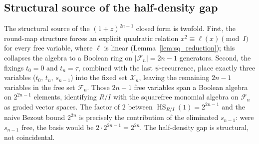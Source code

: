 \documentclass[11pt,a4paper]{article}
\theoremstyle{definition}
\begin{document}
\subsection*{Structural source of the half-density gap}\label{app:dreg:remarks}

The structural source of the $(1 + z)^{2n - 1}$ closed form is
twofold. First, the round-map structure forces an explicit quadratic
relation $x^2 \equiv \ell(x) \pmod I$ for every free variable, where
$\ell$ is linear (Lemma~\ref{lem:sq_reduction}); this collapses the
algebra to a Boolean ring on $|\mathcal{F}_n| = 2n - 1$ generators.
Second, the fixings $t_0 = 0$ and $t_n = \tau$, combined with the
last $\psi$-recurrence, place exactly three variables ($t_0$, $t_n$,
$s_{n-1}$) into the fixed set $\mathcal{X}_n$, leaving the remaining
$2n - 1$ variables in the free set $\mathcal{F}_n$. Those $2n-1$ free
variables span a Boolean algebra on $2^{2n-1}$ elements, identifying
$R/I$ with the squarefree monomial algebra on $\mathcal{F}_n$ as
graded vector spaces.
The factor of $2$ between $\operatorname{HS}_{R/I}(1) = 2^{2n-1}$ and
the naive Bezout bound $2^{2n}$ is precisely the contribution of the
eliminated $s_{n-1}$: were $s_{n-1}$ free, the basis would be
$2 \cdot 2^{2n-1} = 2^{2n}$. The half-density gap is structural,
not coincidental.
\end{document}
